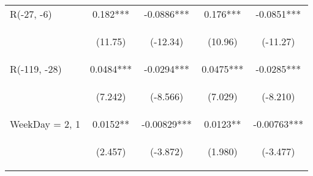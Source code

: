 \documentclass[]{article}
\begin{document}
\begin{center}
\begin{tabular}{lcccc}
        R(-27, -6)       & 0.182***                                        & -0.0886***                                     & 0.176***                                       & -0.0851***                                     \\
        \vspace{4pt}     & \begin{footnotesize}(11.75)\end{footnotesize}   & \begin{footnotesize}(-12.34)\end{footnotesize} & \begin{footnotesize}(10.96)\end{footnotesize}  & \begin{footnotesize}(-11.27)\end{footnotesize} \\
        R(-119, -28)     & 0.0484***                                       & -0.0294***                                     & 0.0475***                                      & -0.0285***                                     \\
        \vspace{4pt}     & \begin{footnotesize}(7.242)\end{footnotesize}   & \begin{footnotesize}(-8.566)\end{footnotesize} & \begin{footnotesize}(7.029)\end{footnotesize}  & \begin{footnotesize}(-8.210)\end{footnotesize} \\
        WeekDay = 2, 1   & 0.0152**                                        & -0.00829***                                    & 0.0123**                                       & -0.00763***                                    \\
        \vspace{4pt}     & \begin{footnotesize}(2.457)\end{footnotesize}   & \begin{footnotesize}(-3.872)\end{footnotesize} & \begin{footnotesize}(1.980)\end{footnotesize}  & \begin{footnotesize}(-3.477)\end{footnotesize} \\

\end{tabular}
\end{center}
\end{document}
